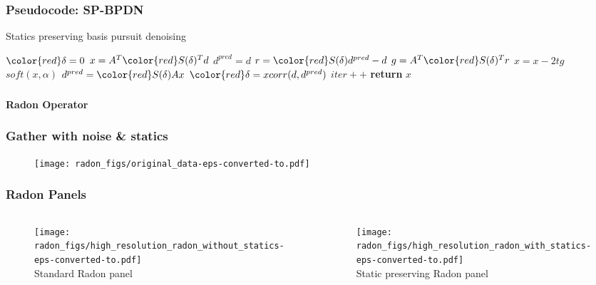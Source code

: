 \begin{frame} \frametitle{Pseudocode: SP-BPDN}
\begin{algorithm}[H]
\renewcommand{\thealgorithm}{}
\tiny
\caption{Statics preserving basis pursuit denoising}\label{SPBPDN}
\begin{algorithmic}
   \State ${\color{red}\delta=0}$ 
   \State $x=A^T{\color{red}S(\delta)^T}d$ 
   \State $d^{pred}=d$ 
      \State $r={\color{red}S(\delta)}d^{pred} - d$ 
      \State $g=A^T{\color{red}S(\delta)^T}r$
      \State $x = x - 2tg$
      \State $soft(x,\alpha)$
      \State $d^{pred} = {\color{red}S(\delta)}Ax$
      \State ${\color{red}\delta=xcorr(d,d^{pred})}$
      \State $iter++$
   \EndWhile
   \State \textbf{return} $x$
\EndProcedure
\end{algorithmic}
\end{algorithm}
\end{frame}

\begin{frame} \frametitle{ }
	\begin{center}
        \LARGE {\bf Radon Operator}
	\end{center}
\end{frame}

\begin{frame} \frametitle{Gather with noise \& statics}
	\begin{center}
	\begin{figure} 
	\texttt{[image: radon\_figs/original\_data-eps-converted-to.pdf]} \\
	\end{figure} 
	\end{center}
\end{frame}

\begin{frame} \frametitle{Radon Panels}
\begin{columns}[c]
\column{2in} 
	\begin{center}
	\begin{figure} 
	\texttt{[image: radon\_figs/high\_resolution\_radon\_without\_statics-eps-converted-to.pdf]} \\ 
	\tiny Standard Radon panel
	\end{figure} 
	\end{center}
\column{2in}
	\begin{center}
	\begin{figure} 
	\texttt{[image: radon\_figs/high\_resolution\_radon\_with\_statics-eps-converted-to.pdf]} \\
	\tiny Static preserving Radon panel
	\end{figure}
	\end{center}
\end{columns}
\end{frame}


